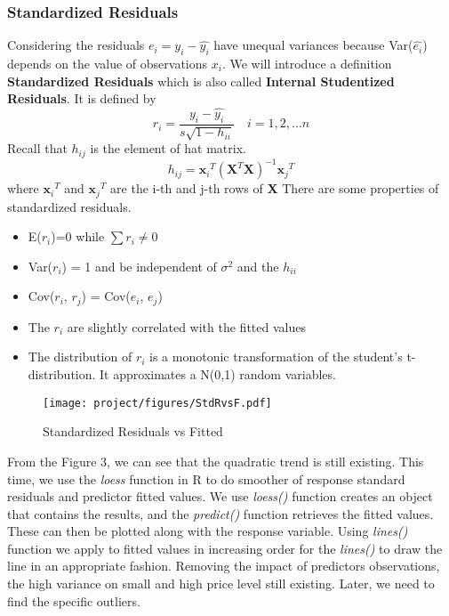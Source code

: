 \documentclass[a4paper]{article}
\begin{document}
\subsubsection{Standardized Residuals}
Considering the residuals $e_i=y_i - \hat{y_i}$ have unequal variances because Var($\hat{e_i}$) depends on the value of observations $x_i$. We will introduce a definition \textbf{Standardized Residuals} which is also called \textbf{Internal Studentized Residuals}. It is defined by
\begin{equation*}
        r_i = \frac{y_i-\hat{y_i}}{s\sqrt{1-h_{ii}}} \quad i=1,2,... n
\end{equation*}
Recall that $h_{ij}$ is the element of hat matrix.
\begin{equation*}
        h_{ij} = {\textbf{x}_i}^T (\textbf{X}^T\textbf{X})^{-1}{\textbf{x}_j}^T
\end{equation*}
where ${\textbf{x}_i}^T$ and ${\textbf{x}_j}^T$ are the i-th and j-th rows of \textbf{X}
There are some properties of standardized residuals.
\begin{itemize}
    \item E($r_i$)=0 while $\sum r_i \neq 0$
    \item Var($r_i$) = 1 and be independent of $\sigma^2$ and the $h_{ii}$
    \item Cov($r_i$, $r_j$) = Cov($e_i$, $e_j$)
    \item The $r_i$ are slightly correlated with the fitted values
    \item The distribution of $r_i$ is a monotonic transformation of the student's t-distribution. It approximates a N(0,1) random variables.
\end{itemize}


\begin{figure}[!htb]
    \centering
    \texttt{[image: project/figures/StdRvsF.pdf]}
    \caption{Standardized Residuals vs Fitted}
    \label{5}
\end{figure}

\noindent
From the Figure 3, we can see that the quadratic trend is still existing. This time, we use the \textit{loess} function in R to do smoother of response standard residuals and predictor fitted values. We use \textit{loess()} function creates an object that contains the results, and the \textit{predict()} function retrieves the fitted values. These can then be plotted along with the response variable. Using \textit{lines()} function we apply to fitted values in increasing order for the \textit{lines()} to draw the line in an appropriate fashion. Removing the impact of predictors observations, the high variance on small and high price level still existing. Later, we need to find the specific outliers. \\
\end{document}
